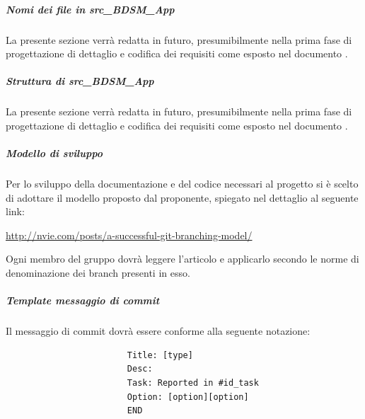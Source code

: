 				\subparagraph{Nomi dei file in src\_BDSM\_App}
				La presente sezione verrà redatta in futuro, presumibilmente nella prima fase di progettazione di dettaglio e codifica dei requisiti come esposto nel documento \docNameVersionPdP.
				\subparagraph{Struttura di src\_BDSM\_App}
				La presente sezione verrà redatta in futuro, presumibilmente nella prima fase di progettazione di dettaglio e codifica dei requisiti come esposto nel documento \docNameVersionPdP.

				\subparagraph{Modello di sviluppo}
				Per lo sviluppo della documentazione e del codice necessari al progetto si è scelto di adottare il modello proposto dal proponente, spiegato nel dettaglio al seguente link:
					\begin{center}
						\url{http://nvie.com/posts/a-successful-git-branching-model/}
					\end{center}
					Ogni membro del gruppo dovrà leggere l'articolo e applicarlo secondo le norme di denominazione dei branch presenti in esso.

				\subparagraph{Template messaggio di commit}
				\label{sec:messaggio_di_commit}
				Il messaggio di commit dovrà essere conforme alla seguente notazione:
					\begin{verbatim}
						Title: [type]
						Desc:
						Task: Reported in #id_task
						Option: [option][option]
						END
					\end{verbatim}
				

